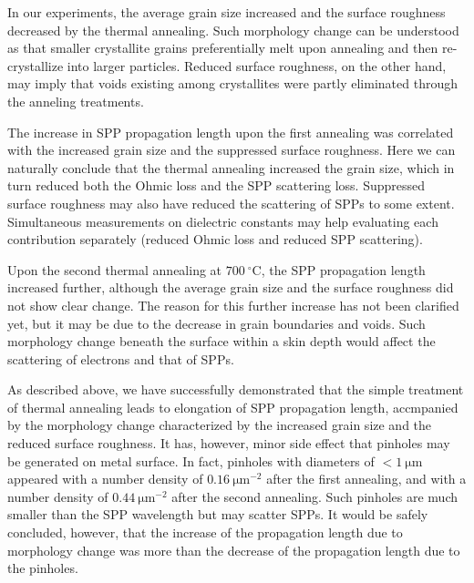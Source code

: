 \documentclass[aip,apl,reprint]{revtex4-1}
\begin{document}
In our experiments, the average grain size increased and the surface roughness decreased by the thermal annealing. Such morphology change can be understood as that smaller crystallite grains preferentially melt upon annealing\cite{Buffat} and then re-crystallize into larger particles. Reduced surface roughness, on the other hand, may imply that voids existing among crystallites were partly eliminated through the anneling treatments.  

The increase in SPP propagation length upon the first annealing was correlated with the increased grain size and the suppressed surface roughness. Here we can naturally conclude that the thermal annealing increased the grain size, which in turn reduced both the Ohmic loss and the SPP scattering loss. Suppressed surface roughness may also have reduced the scattering of SPPs to some extent. Simultaneous measurements on dielectric constants may help evaluating each contribution separately (reduced Ohmic loss and reduced SPP scattering). 

Upon the second thermal annealing at $700\:^\circ\mathrm{C}$, the SPP propagation length increased further, although the average grain size and the surface roughness did not show clear change. The reason for this further increase has not been clarified yet, but it may be due to the decrease in grain boundaries and voids. Such morphology change beneath the surface within a skin depth would affect the scattering of electrons and that of SPPs. 

As described above, we have successfully demonstrated that the simple treatment of thermal annealing leads to elongation of SPP propagation length, accmpanied by the morphology change characterized by the increased grain size and the reduced surface roughness. It has, however, minor side effect that pinholes may be generated on metal surface. In fact, pinholes with diameters of $<1\:\mathrm{\mu m}$ appeared with a number density of $0.16\:\mathrm{\mu m}^{-2}$ after the first annealing, and with a number density of $0.44\:\mathrm{\mu m}^{-2}$ after the second annealing. Such pinholes are much smaller than the SPP wavelength but may scatter SPPs. It would be safely concluded, however, that the increase of the propagation length due to morphology change was more than the decrease of the propagation length due to the pinholes.
	
\end{document}
